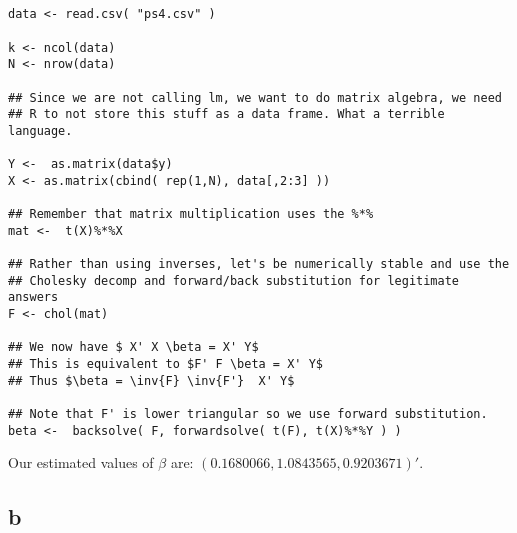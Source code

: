\documentclass[12pt]{paper}
\begin{document}
\begin{verbatim}


data <- read.csv( "ps4.csv" )

k <- ncol(data)
N <- nrow(data)

## Since we are not calling lm, we want to do matrix algebra, we need
## R to not store this stuff as a data frame. What a terrible language.

Y <-  as.matrix(data$y)
X <- as.matrix(cbind( rep(1,N), data[,2:3] ))

## Remember that matrix multiplication uses the %*%
mat <-  t(X)%*%X

## Rather than using inverses, let's be numerically stable and use the
## Cholesky decomp and forward/back substitution for legitimate answers
F <- chol(mat)

## We now have $ X' X \beta = X' Y$
## This is equivalent to $F' F \beta = X' Y$
## Thus $\beta = \inv{F} \inv{F'}  X' Y$

## Note that F' is lower triangular so we use forward substitution.
beta <-  backsolve( F, forwardsolve( t(F), t(X)%*%Y ) )

\end{verbatim}

Our estimated values of $\beta$ are: $(0.1680066, 1.0843565, 0.9203671)'$.

\subsection*{b}
\end{document}
